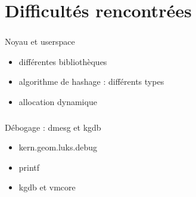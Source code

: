 \section{Difficultés rencontrées}

\begin{frame}
	\frametitle{\insertsectionhead}
	\begin{block}{Noyau et userspace}
		\begin{itemize}
			\item différentes bibliothèques
			\item algorithme de hashage : différents types
			\item allocation dynamique
		\end{itemize}
	\end{block}
\end{frame}

\begin{frame}
	\frametitle{\insertsectionhead}
	\begin{block}{Débogage : dmesg et kgdb}
		\begin{itemize}
			\item kern.geom.luks.debug
			\item printf
			\item kgdb et vmcore
		\end{itemize}
	\end{block}
\end{frame}



